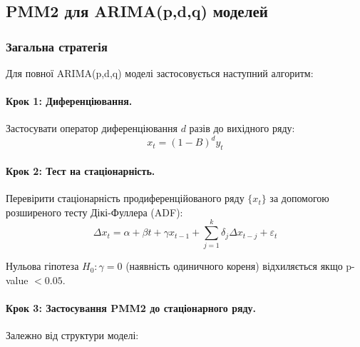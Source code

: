 \subsection{PMM2 для ARIMA(p,d,q) моделей}
\label{subsec:pmm2_arima}

\subsubsection{Загальна стратегія}
\label{subsubsec:arima_strategy}

Для повної ARIMA(p,d,q) моделі застосовується наступний алгоритм:

\paragraph{Крок 1: Диференціювання.} Застосувати оператор диференціювання $d$ разів до вихідного ряду:
\begin{equation}
\label{eq:differencing}
x_t = (1-B)^d y_t
\end{equation}

\paragraph{Крок 2: Тест на стаціонарність.} Перевірити стаціонарність продиференційованого ряду $\{x_t\}$ за допомогою розширеного тесту Дікі-Фуллера (ADF):
\begin{equation}
\label{eq:adf_test}
\Delta x_t = \alpha + \beta t + \gamma x_{t-1} + \sum_{j=1}^{k} \delta_j \Delta x_{t-j} + \varepsilon_t
\end{equation}

Нульова гіпотеза $H_0: \gamma = 0$ (наявність одиничного кореня) відхиляється якщо p-value $< 0.05$.

\paragraph{Крок 3: Застосування PMM2 до стаціонарного ряду.} Залежно від структури моделі:


